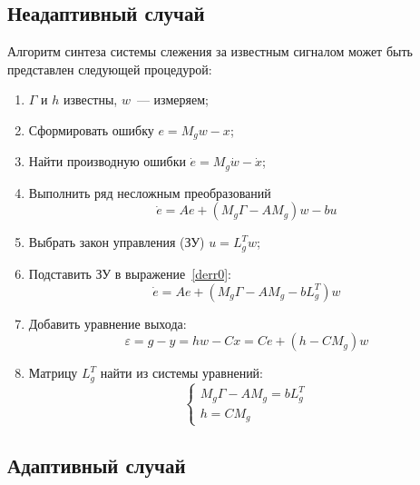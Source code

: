 \subsection{Неадаптивный случай}

Алгоритм синтеза системы слежения за известным сигналом может быть представлен следующей процедурой:
\begin{enumerate}[1.]
	\item $\Gamma$ и $h$ известны, $w$~--- измеряем;
	\item Сформировать ошибку $e = M_g w - x$;
	\item Найти производную ошибки $\dot{e} = M_g \dot{w} - \dot{x}$;
	\item Выполнить ряд несложным преобразований 
		\begin{equation}\label{derr0}
		\dot{e} = A e  + (M_g \Gamma  - A M_g) w - b u
		\end{equation}
	\item Выбрать закон управления (ЗУ) $u = L_g^T w$;
	\item Подставить ЗУ в выражение~\eqref{derr0}:
		\begin{equation}\label{derr0_fin}
		\dot{e} = A e  + (M_g \Gamma - A M_g - b L_g^T) w
		\end{equation}
	\item Добавить уравнение выхода:
		\begin{equation}
			\varepsilon = g - y = h w - C x = C e + (h - C M_g) w
		\end{equation}
	\item Матрицу $L_g^T$ найти из системы уравнений:
		\begin{equation}
			\begin{cases}
				M_g \Gamma - A M_g = b L_g^T \\
				h = C M_g
			\end{cases}
		\end{equation}
\end{enumerate}

\subsection{Адаптивный случай}

